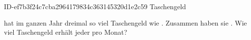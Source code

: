 \begin{exercise}
      {ID-ef7b3f24c7cba2964179834c363145320d1e2c59}
      {Taschengeld}
  \ifproblem\problem\par
    \xya{} hat im ganzen Jahr dreimal so viel Taschengeld wie \xyb.
    Zusammen haben sie . Wie viel Taschengeld erhält jeder pro Monat?
  \fi
\end{exercise}

